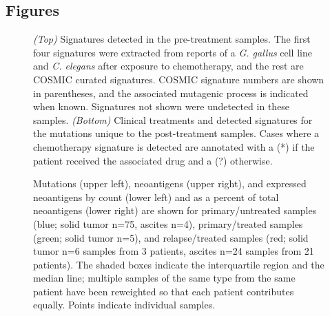 \documentclass{bmcart}
\begin{document}
\begin{backmatter}



\section*{Figures}

\begin{figure}[h!]
  \caption{
      \textit{(Top)} Signatures detected in the pre-treatment samples. The first four signatures were extracted from reports of a \textit{G. gallus} cell line and \textit{C. elegans} after exposure to chemotherapy, and the rest are COSMIC curated signatures. COSMIC signature numbers are shown in parentheses, and the associated mutagenic process is indicated when known. Signatures not shown were undetected in these samples. \textit{(Bottom)} Clinical treatments and detected signatures for the mutations unique to the post-treatment samples. Cases where a chemotherapy signature is detected are annotated with a (*) if the patient received the associated drug and a (?) otherwise.}
      \end{figure}

  \begin{figure}[h!]
  \caption{
      Mutations (upper left), neoantigens (upper right), and expressed neoantigens by count (lower left) and as a percent of total neoantigens (lower right) are shown for primary/untreated samples (blue; solid tumor n=75, ascites n=4), primary/treated samples (green; solid tumor n=5), and relapse/treated samples (red; solid tumor n=6 samples from 3 patients, ascites n=24 samples from 21 patients). The shaded boxes indicate the interquartile region and the median line; multiple samples of the same type from the same patient have been reweighted so that each patient contributes equally. Points indicate individual samples.}
      \end{figure}
      

\end{backmatter}
\end{document}
